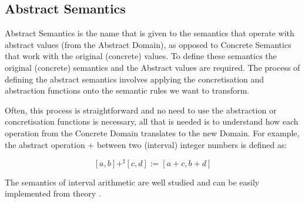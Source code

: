 \subsection{Abstract Semantics}\label{abstract-semantics}


Abstract Semantics is the name that is given to the semantics that operate with abstract
values (from the Abstract Domain), as opposed to Concrete Semantics that work with the
original (concrete) values. To define these semantics the original (concrete) semantics
and the Abstract values are required. The process of defining the abstract semantics
involves applying the concretisation and abstraction functions onto the semantic rules we
want to transform.

Often, this process is straightforward and no need to use the abstraction or
concretisation functions is necessary, all that is needed is to understand how each
operation from the Concrete Domain translates to the new Domain. For example, the
abstract operation \(+\) between two (interval) integer numbers is defined as:

\[[a, b] +^{\sharp} [c, d] := [a+c, b+d]\]

The semantics of interval arithmetic are well studied and can be easily implemented from
theory \autocite{hayes_interval_2003}.


%
%
%
%

